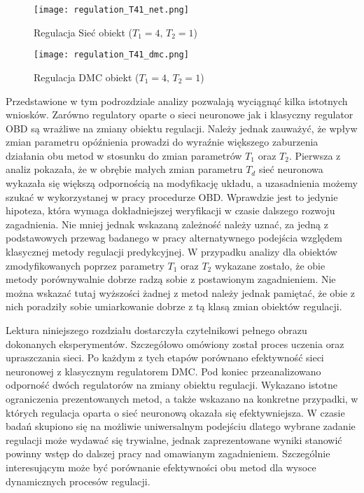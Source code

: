 \begin{figure}[!htb]
\centering
\begin{minipage}{.5\textwidth}
  \label{fig:Regulation-T41-net}
  \centering \texttt{[image: regulation\_T41\_net.png]}
  \caption{Regulacja Sieć obiekt (\( T_1=4, \, T_2=1 \))}
  \label{fig:test1}
\end{minipage}%
\begin{minipage}{.5\textwidth}
  \label{fig:Regulation-T41-dmc}
  \centering \texttt{[image: regulation\_T41\_dmc.png]}
  \caption{Regulacja DMC obiekt (\( T_1=4, \, T_2=1 \))}
\end{minipage}
\end{figure}

\par Przedstawione w tym podrozdziale analizy pozwalają wyciągnąć kilka istotnych wniosków. Zarówno regulatory oparte o sieci neuronowe jak i klasyczny regulator OBD są wrażliwe na zmiany obiektu regulacji. Należy jednak zauważyć, że wpływ zmian parametru opóźnienia prowadzi do wyraźnie większego zaburzenia działania obu metod w stosunku do zmian parametrów \(T_1 \) oraz \(T_2\). Pierwsza z analiz pokazała, że w obrębie małych zmian parametru \(T_d\) sieć neuronowa wykazała się większą odpornością na modyfikację układu, a uzasadnienia możemy szukać w wykorzystanej w pracy procedurze OBD. Wprawdzie jest to jedynie hipoteza, która wymaga dokładniejszej weryfikacji w czasie dalszego rozwoju zagadnienia. Nie mniej jednak wskazaną zależność należy uznać, za jedną z podstawowych przewag badanego w pracy alternatywnego podejścia względem klasycznej metody regulacji predykcyjnej. W przypadku analizy dla obiektów zmodyfikowanych poprzez parametry \(T_1 \) oraz \(T_2\) wykazane zostało, że obie metody porównywalnie dobrze radzą sobie z postawionym zagadnieniem. Nie można wskazać tutaj wyższości żadnej z metod należy jednak pamiętać, że obie z nich poradziły sobie umiarkowanie dobrze z tą klasą zmian obiektów regulacji.
\par Lektura niniejszego rozdziału dostarczyła czytelnikowi pełnego obrazu dokonanych eksperymentów. Szczegółowo omówiony został proces uczenia oraz upraszczania sieci. Po każdym z tych etapów porównano efektywność sieci neuronowej z klasycznym regulatorem DMC. Pod koniec przeanalizowano odporność dwóch regulatorów na zmiany obiektu regulacji. Wykazano istotne ograniczenia prezentowanych metod, a także wskazano na konkretne przypadki, w których regulacja oparta o sieć neuronową okazała się efektywniejsza. W czasie badań skupiono się na możliwie uniwersalnym podejściu dlatego wybrane zadanie regulacji może wydawać się trywialne, jednak zaprezentowane wyniki stanowić powinny wstęp do dalszej pracy nad omawianym zagadnieniem. Szczególnie interesującym może być porównanie efektywności obu metod dla wysoce dynamicznych procesów regulacji.  
